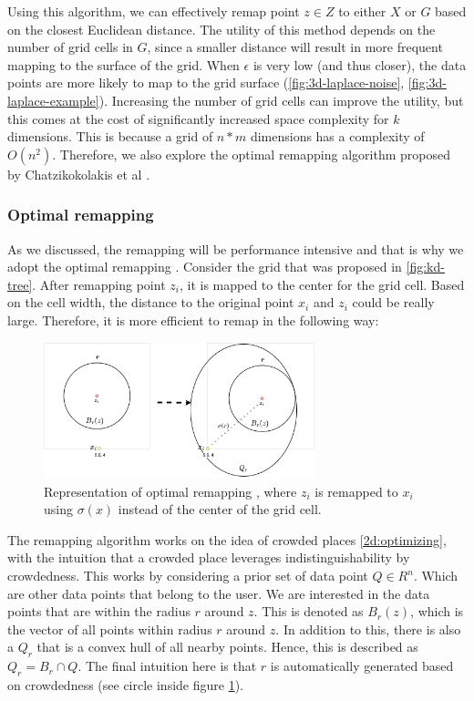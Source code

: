 Using this algorithm, we can effectively remap point $z \in Z$ to either $X$ or $G$ based on the closest Euclidean distance.
The utility of this method depends on the number of grid cells in $G$, since a smaller distance will result in more frequent mapping to the surface of the grid.
When $\epsilon$ is very low (and thus closer), the data points are more likely to map to the grid surface (\ref{fig:3d-laplace-noise}, \ref{fig:3d-laplace-example}).
Increasing the number of grid cells can improve the utility, but this comes at the cost of significantly increased space complexity for $k$ dimensions.
This is because a grid of $n*m$ dimensions has a complexity of $O(n^2)$.
Therefore, we also explore the optimal remapping algorithm proposed by Chatzikokolakis et al \citep{chatzikokolakis_efficient_2017}.

\subsubsection{Optimal remapping}
As we discussed, the remapping will be performance intensive and that is why we adopt the optimal remapping \citep{chatzikokolakis_efficient_2017}.
Consider the grid that was proposed in \ref{fig:kd-tree}.
After remapping point $z_i$, it is mapped to the center for the grid cell.
Based on the cell width, the distance to the original point $x_i$ and $ z_i$ could be really large.
Therefore, it is more efficient to remap in the following way:
\begin{figure}[H]
  \includegraphics[width=0.7\textwidth]{TheorethicalFramework/ND-Laplace/Images/optimal-remapping.png}
  \caption{Representation of optimal remapping \citep{chatzikokolakis_efficient_2017}, where $z_i$ is remapped to $x_i$ using $\sigma(x)$ instead of the center of the grid cell.}
  \label{fig:optimal-remapping}
\end{figure}
The remapping algorithm works on the idea of crowded places \ref{2d:optimizing}, with the intuition that a crowded place leverages indistinguishability by crowdedness.
This works by considering a prior set of data point $Q \in R^n$.
Which are other data points that belong to the user.
We are interested in the data points that are within the radius $r$ around $z$.
This is denoted as $B_r(z)$, which is the vector of all points within radius $r$ around $z$.
In addition to this, there is also a $Q_r$ that is a convex hull of all nearby points.
Hence, this is described as $Q_r = B_r \cap Q$.
The final intuition here is that $r$ is automatically generated based on crowdedness (see circle inside figure \ref{fig:optimal-remapping}).

